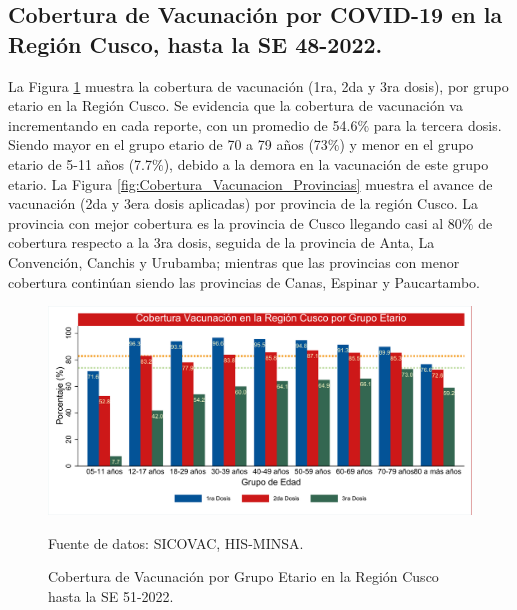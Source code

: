 \documentclass[12pt,a4paper,openany]{book}
\begin{document}
	\subsection*{Cobertura de Vacunación por COVID-19 en la Región Cusco, hasta la SE 48-2022.}
	\noindent La Figura \ref{fig:vacuna_edad} muestra la cobertura de vacunación (1ra, 2da y 3ra dosis), por grupo etario en la Región Cusco. Se evidencia que la cobertura de vacunación va incrementando en cada reporte, con un promedio de 54.6$\%$ para la tercera dosis. Siendo mayor en el grupo etario de 70 a 79 años (73$\%$) y menor en el grupo etario de 5-11 años (7.7$\%$), debido a la demora en la vacunación de este grupo etario.
	La Figura \ref{fig:Cobertura_Vacunacion_Provincias} muestra el avance de vacunación (2da y 3era dosis aplicadas) por provincia de la región Cusco. La provincia con mejor cobertura es la provincia de Cusco llegando casi al 80$\%$ de cobertura respecto a la 3ra dosis, seguida de la provincia de Anta, La Convención, Canchis y Urubamba; mientras que las provincias con menor cobertura continúan siendo las provincias de Canas, Espinar y Paucartambo. 
	\begin{figure}[h]
		\caption{Cobertura de Vacunación por Grupo Etario en la Región Cusco hasta la SE 51-2022. }\label{fig:vacuna_edad}
		\begin{center}
			\includegraphics[width=1\linewidth]{../figuras/vacunacion_grupo_edad_dosis.pdf}
		\end{center}
		{\footnotesize {Fuente de datos: SICOVAC, HIS-MINSA.}}
	\end{figure}
	\clearpage
	
\end{document}
